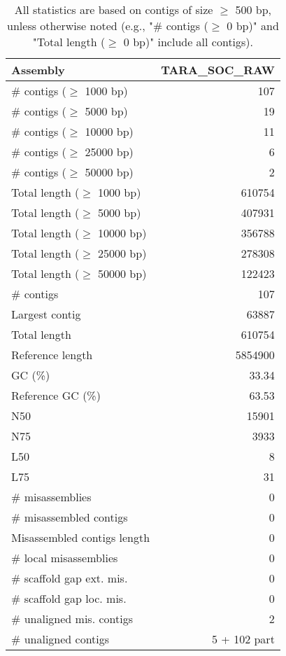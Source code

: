 \documentclass[12pt,a4paper]{article}
\begin{document}
\begin{table}[ht]
\begin{center}
\caption{All statistics are based on contigs of size $\geq$ 500 bp, unless otherwise noted (e.g., "\# contigs ($\geq$ 0 bp)" and "Total length ($\geq$ 0 bp)" include all contigs).}
\begin{tabular}{|l*{1}{|r}|}
\hline
Assembly & TARA\_SOC\_RAW \\ \hline
\# contigs ($\geq$ 1000 bp) & 107 \\ \hline
\# contigs ($\geq$ 5000 bp) & 19 \\ \hline
\# contigs ($\geq$ 10000 bp) & 11 \\ \hline
\# contigs ($\geq$ 25000 bp) & 6 \\ \hline
\# contigs ($\geq$ 50000 bp) & 2 \\ \hline
Total length ($\geq$ 1000 bp) & 610754 \\ \hline
Total length ($\geq$ 5000 bp) & 407931 \\ \hline
Total length ($\geq$ 10000 bp) & 356788 \\ \hline
Total length ($\geq$ 25000 bp) & 278308 \\ \hline
Total length ($\geq$ 50000 bp) & 122423 \\ \hline
\# contigs & 107 \\ \hline
Largest contig & 63887 \\ \hline
Total length & 610754 \\ \hline
Reference length & 5854900 \\ \hline
GC (\%) & 33.34 \\ \hline
Reference GC (\%) & 63.53 \\ \hline
N50 & 15901 \\ \hline
N75 & 3933 \\ \hline
L50 & 8 \\ \hline
L75 & 31 \\ \hline
\# misassemblies & 0 \\ \hline
\# misassembled contigs & 0 \\ \hline
Misassembled contigs length & 0 \\ \hline
\# local misassemblies & 0 \\ \hline
\# scaffold gap ext. mis. & 0 \\ \hline
\# scaffold gap loc. mis. & 0 \\ \hline
\# unaligned mis. contigs & 2 \\ \hline
\# unaligned contigs & 5 + 102 part \\ \hline

\end{tabular}
\end{center}
\end{table}
\end{document}
